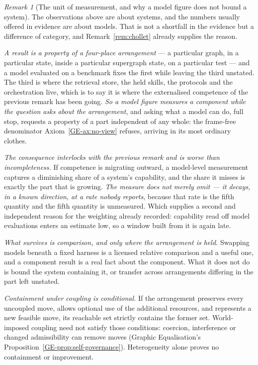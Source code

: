 \documentclass[11pt,a4paper]{article}
\theoremstyle{remark}
\newtheorem{remark}[definition]{Remark}
\begin{document}
\begin{remark}[The unit of measurement, and why a model figure does not bound a system]\label{rem:unit}
The observations above are about systems, and the numbers usually offered in evidence are about models.
That is not a shortfall in the evidence but a difference of category, and Remark~\ref{rem:chollet}
already supplies the reason.

\emph{A result is a property of a four-place arrangement} --- a particular graph, in a particular state,
inside a particular supergraph state, on a particular test --- and a model evaluated on a benchmark
fixes the first while leaving the third unstated. The third is where the retrieval store, the held
skills, the protocols and the orchestration live, which is to say it is where the externalised
competence of the previous remark has been going. \emph{So a model figure measures a component while the
question asks about the arrangement}, and asking what a model can do, full stop, requests a property of
a part independent of any whole: the frame-free denominator Axiom~\ref{GE-ax:no-view} refuses, arriving in its most
ordinary clothes.

\emph{The consequence interlocks with the previous remark and is worse than incompleteness.} If
competence is migrating outward, a model-level measurement captures a diminishing share of a system's
capability, and the share it misses is exactly the part that is growing. \emph{The measure does not
merely omit --- it decays, in a known direction, at a rate nobody reports}, because that rate is the
fifth quantity and the fifth quantity is unmeasured. Which supplies a second and independent reason for
the weighting already recorded: capability read off model evaluations enters an estimate low, so a
window built from it is again late.

\emph{What survives is comparison, and only where the arrangement is held.} Swapping models beneath a
fixed harness is a licensed relative comparison and a useful one, and a component result is a real fact
about the component. What it does not do is bound the system containing it, or transfer across
arrangements differing in the part left unstated.

\emph{Containment under coupling is conditional.} If the arrangement
preserves every uncoupled move, allows optional use of the additional
resources, and represents a new feasible move, its reachable set strictly
contains the former set. World-imposed coupling need not satisfy those
conditions: coercion, interference or changed admissibility can remove
moves (Graphic Equalisation's Proposition~\ref{GE-prop:self-governance}).
Heterogeneity alone proves no containment or improvement.


\end{remark}
\end{document}

